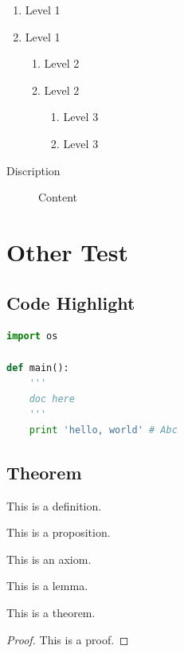 \documentclass[degree=bachelor]{hustthesis-en}
\begin{document}
\begin{enumerate}
    \item Level 1
    \item Level 1
    \begin{enumerate}
        \item Level 2
        \item Level 2
        \begin{enumerate}
            \item Level 3
            \item Level 3
        \end{enumerate}
    \end{enumerate}
\end{enumerate}

\begin{description}
    \item[Discription]  Content
\end{description}

\chapter{Other Test}

\section{Code Highlight}

\begin{lstlisting}[language=python]
import os

def main():
    '''
    doc here
    '''
    print 'hello, world' # Abc
\end{lstlisting}

\section{Theorem}

\begin{definition}
This is a definition.
\end{definition}
\begin{proposition}
This is a proposition.
\end{proposition}
\begin{axiom}
This is an axiom.
\end{axiom}
\begin{lemma}
This is a lemma.
\end{lemma}
\begin{theorem}
This is a theorem.
\end{theorem}
\begin{proof}
This is a proof.
\end{proof}
\end{document}
